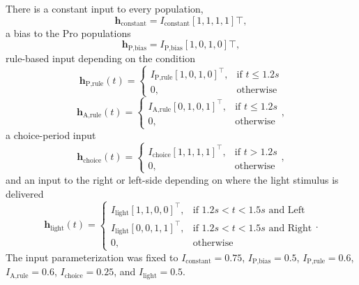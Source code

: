 \documentclass[11pt]{article}
\begin{document}
There is a constant input to every population,
\begin{equation}\mathbf{h}_{\text{constant}} = I_{\text{constant}} [1, 1, 1, 1]\top,
\end{equation}
 a bias to the Pro populations
\begin{equation}\mathbf{h}_{\text{P,bias}} = I_{\text{P,bias}} [1, 0, 1, 0]\top,
\end{equation}
rule-based input depending on the condition
\begin{equation}\mathbf{h}_{\text{P,rule}}(t) = \begin{cases}
                           I_{\text{P,rule}} [1, 0, 1, 0]^\top,& \text{if } t\leq 1.2s \\
                            0,              & \text{otherwise}
                         \end{cases}
\end{equation}
\begin{equation} \mathbf{h}_{\text{A,rule}}(t) = \begin{cases}
                           I_{\text{A,rule}} [0, 1, 0, 1]^\top,& \text{if } t\leq 1.2s \\
                            0,              & \text{otherwise}
                         \end{cases},
\end{equation}
a choice-period input
\begin{equation} \mathbf{h}_{\text{choice}}(t) = \begin{cases}
                           I_{\text{choice}} [1, 1, 1, 1]^\top,& \text{if } t > 1.2s \\
                            0,              & \text{otherwise}
                         \end{cases},
\end{equation}
and an input to the right or left-side depending on where the light stimulus is delivered    
\begin{equation}  \mathbf{h}_{\text{light}}(t) = \begin{cases}
                           I_{\text{light}} [1, 1, 0, 0]^\top,& \text{if } 1.2s < t < 1.5s \text{ and Left} \\
                           I_{\text{light}} [0, 0, 1, 1]^\top,& \text{if } 1.2s < t < 1.5s \text{ and Right} \\
                            0,              & \text{otherwise}
                         \end{cases}.
\end{equation}
The input parameterization was fixed to $I_{\text{constant}} = 0.75$, $I_{\text{P,bias}} = 0.5 $, $I_{\text{P,rule}} = 0.6$,  $I_{\text{A,rule}} = 0.6$,  $I_{\text{choice}} = 0.25$,  and $I_{\text{light}} = 0.5$.
\end{document}
